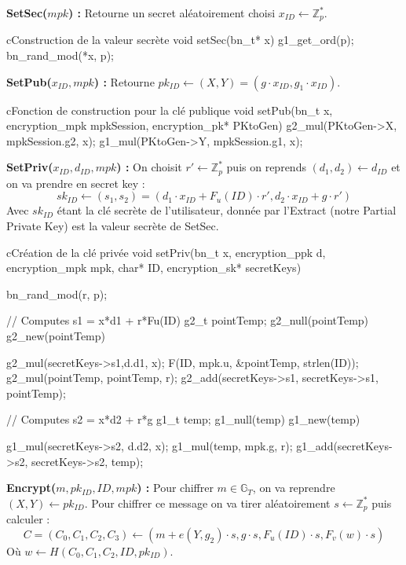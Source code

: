 \textbf{SetSec($mpk$) :} Retourne un secret aléatoirement choisi $x_{ID} \leftarrow \mathbb{Z}_p^*$.

\begin{sourcebox}{c}{Construction de la valeur secrète}
	void setSec(bn_t* x){
		g1_get_ord(p);
		bn_rand_mod(*x, p);
	}
\end{sourcebox}

\textbf{SetPub($x_{ID}, mpk$) :} Retourne $pk_{ID} \leftarrow (X,Y) = (g \cdot x_{ID}, g_1 \cdot x_{ID})$.

\begin{sourcebox}{c}{Fonction de construction pour la clé publique}
	void setPub(bn_t x, encryption_mpk mpkSession, encryption_pk* PKtoGen){
		g2_mul(PKtoGen->X, mpkSession.g2, x);
		g1_mul(PKtoGen->Y, mpkSession.g1, x);
	}
\end{sourcebox}

\textbf{SetPriv($x_{ID}, d_{ID}, mpk$) :} On choisit $r' \leftarrow \mathbb{Z}_p^*$ puis on reprends $(d_1, d_2) \leftarrow d_{ID}$ et on va prendre en secret key : 
\[sk_{ID} \leftarrow (s_1, s_2) = (d_1 \cdot x_{ID} + F_u(ID) \cdot r', d_2 \cdot x_{ID} + g \cdot r')\]
Avec $sk_{ID}$ étant la clé secrète de l'utilisateur, donnée par l'Extract (notre Partial Private Key) est la valeur secrète de SetSec.

\begin{sourcebox}{c}{Création de la clé privée}
	void setPriv(bn_t x, encryption_ppk d, encryption_mpk mpk, char* ID, encryption_sk* secretKeys){
		bn_rand_mod(r, p);
		
		// Computes s1 = x*d1 + r*Fu(ID)
		g2_t pointTemp;
		g2_null(pointTemp)
		g2_new(pointTemp)
		
		g2_mul(secretKeys->s1,d.d1, x);
		F(ID, mpk.u, &pointTemp, strlen(ID));
		g2_mul(pointTemp, pointTemp, r);
		g2_add(secretKeys->s1, secretKeys->s1, pointTemp);
		
		// Computes s2 = x*d2 + r*g
		g1_t temp;
		g1_null(temp)
		g1_new(temp)
		
		g1_mul(secretKeys->s2, d.d2, x);
		g1_mul(temp, mpk.g, r);
		g1_add(secretKeys->s2, secretKeys->s2, temp);
	}
\end{sourcebox}

\textbf{Encrypt($m, pk_{ID}, ID, mpk$) :} Pour chiffrer $m \in \mathbb{G}_T$, on va reprendre $(X,Y) \leftarrow pk_{ID}$. Pour chiffrer ce message on va tirer aléatoirement $s \leftarrow \mathbb{Z}_p^*$ puis calculer : 
\[C = (C_0, C_1, C_2, C_3) \leftarrow (m + e(Y, g_2) \cdot s, g \cdot s,F_u(ID) \cdot s, F_v(w) \cdot s )\]
Où $w \leftarrow H(C_0,C_1, C_2, ID, pk_{ID})$.

